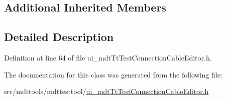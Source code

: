 \subsection*{Additional Inherited Members}


\subsection{Detailed Description}


Definition at line 64 of file ui\-\_\-mdt\-Tt\-Test\-Connection\-Cable\-Editor.\-h.



The documentation for this class was generated from the following file\-:\begin{DoxyCompactItemize}
\item 
src/mdttools/mdttesttool/\hyperlink{ui__mdt_tt_test_connection_cable_editor_8h}{ui\-\_\-mdt\-Tt\-Test\-Connection\-Cable\-Editor.\-h}\end{DoxyCompactItemize}
